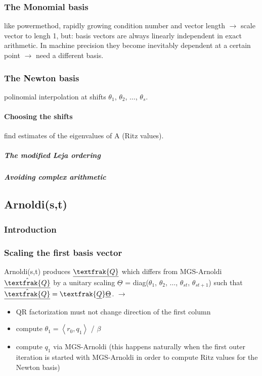 \documentclass{scrartcl}
\begin{document}
\subsubsection{The Monomial basis}
like powermethod, rapidly growing condition number and vector length $\rightarrow$ scale vector to lengh 1, but: basis vectors are always linearly independent in exact arithmetic. In machine precision they become inevitably dependent at a certain point $\rightarrow$ need a different basis.
\subsubsection{The Newton basis}
polinomial interpolation at shifts $\theta_1$, $\theta_2$, $\ldots$, $\theta_s$.
\paragraph{Choosing the shifts}
find estimates of the eigenvalues of A (Ritz values).
\subparagraph{The modified Leja ordering}

\subparagraph{Avoiding complex arithmetic}


\subsection{Arnoldi(s,t)}
\subsubsection{Introduction}
\subsubsection{Scaling the first basis vector}
Arnoldi(s,t) produces $\underline{\textfrak{Q}}$ which differs from MGS-Arnoldi $\underline{\hat{\textfrak{Q}}}$ by a unitary scaling $\underline{\Theta}$ = diag($\theta_1$, $\theta_2$, $\ldots$, $\theta_{st}$, $\theta_{st+1}$) such that $\underline{\hat{\textfrak{Q}}} = \textfrak{\underline{Q}}\underline{\Theta}$. $\rightarrow$
\begin{itemize}
\item QR factorization must not change direction of the first column
\item compute $\theta_1 = \left< r_0, q_1 \right>$ / $\beta$
\item compute $q_1$ via MGS-Arnoldi (this happens naturally when the first outer iteration is started with MGS-Arnoldi in order to compute Ritz values for the Newton basis)
\end{itemize}
\end{document}
